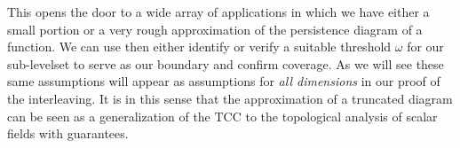 This opens the door to a wide array of applications in which we have either a small portion or a very rough approximation of the persistence diagram of a function.
We can use then either identify or verify a suitable threshold $\omega$ for our sub-levelset to serve as our boundary and confirm coverage.
As we will see these same assumptions will appear as assumptions for \emph{all dimensions} in our proof of the interleaving.
It is in this sense that the approximation of a truncated diagram can be seen as a generalization of the TCC to the topological analysis of scalar fields with guarantees.
